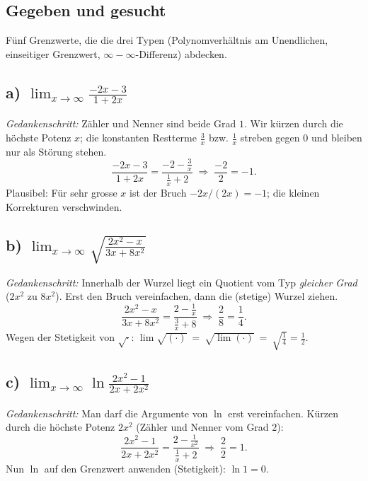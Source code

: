 
\subsection*{Gegeben und gesucht}
Fünf Grenzwerte, die die drei Typen (Polynomverhältnis am Unendlichen,
einseitiger Grenzwert, $\infty-\infty$-Differenz) abdecken.

\subsection*{a) $\displaystyle\lim_{x\to\infty}\frac{-2x-3}{1+2x}$}
\emph{Gedankenschritt:} Zähler und Nenner sind beide Grad $1$. Wir kürzen
durch die höchste Potenz $x$; die konstanten Restterme $\tfrac3x$ bzw.
$\tfrac1x$ streben gegen $0$ und bleiben nur als Störung stehen.
\begin{equation*}
  \frac{-2x-3}{1+2x}=\frac{-2-\frac3x}{\frac1x+2}
\;\Rightarrow\;\frac{-2}{2}=-1.
\end{equation*}
Plausibel: Für sehr grosse $x$ ist der Bruch $-2x/(2x)=-1$; die kleinen
Korrekturen verschwinden.

\subsection*{b) $\displaystyle\lim_{x\to\infty}\sqrt{\frac{2x^2-x}{3x+8x^2}}$}
\emph{Gedankenschritt:} Innerhalb der Wurzel liegt ein Quotient vom Typ
\emph{gleicher Grad} ($2x^2$ zu $8x^2$). Erst den Bruch vereinfachen, dann die
(stetige) Wurzel ziehen.
\begin{equation*}
  \frac{2x^2-x}{3x+8x^2}=\frac{2-\frac1x}{\frac3x+8}
  \;\Rightarrow\;\frac{2}{8}=\frac14 .
\end{equation*}
Wegen der Stetigkeit von $\sqrt{\cdot}$:
$\lim\sqrt{(\cdot)}\ =\ \sqrt{\lim(\cdot)}\ =\ \sqrt{\frac14}=\frac12$.

\subsection*{c) $\displaystyle\lim_{x\to\infty}\ln\!\frac{2x^2-1}{2x+2x^2}$}
\emph{Gedankenschritt:} Man darf die Argumente von $\ln$ erst vereinfachen.
Kürzen durch die höchste Potenz $2x^2$ (Zähler und Nenner vom Grad $2$):
\begin{equation*}
  \frac{2x^2-1}{2x+2x^2}=\frac{2-\frac1{x^2}}{\frac1x+2}
  \;\Rightarrow\;\frac{2}{2}=1 .
\end{equation*}
Nun $\ln$ auf den Grenzwert anwenden (Stetigkeit): $\ln 1=0$.

